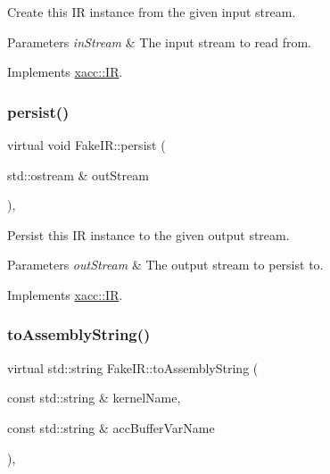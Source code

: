 Create this IR instance from the given input stream.


\begin{DoxyParams}{Parameters}
{\em in\+Stream} & The input stream to read from. \\
\hline
\end{DoxyParams}


Implements \hyperlink{a02480_a444c2e4dc0faac500fb70fa93997e9bc}{xacc\+::\+IR}.

\mbox{\label{a02492_a459bd7e4a007ab80678df279eb038b51}} 
\subsubsection{\texorpdfstring{persist()}{persist()}}
{\footnotesize\ttfamily virtual void Fake\+I\+R\+::persist (\begin{DoxyParamCaption}\item[{std\+::ostream \&}]{out\+Stream }\end{DoxyParamCaption})\hspace{0.3cm}{\ttfamily [inline]}, {\ttfamily [virtual]}}

Persist this IR instance to the given output stream.


\begin{DoxyParams}{Parameters}
{\em out\+Stream} & The output stream to persist to. \\
\hline
\end{DoxyParams}


Implements \hyperlink{a02480_a414b72224d88473ad6190bb88102a3ea}{xacc\+::\+IR}.

\mbox{\label{a02492_ac8b4fa63654de7830e2a6110559ffd87}} 
\subsubsection{\texorpdfstring{to\+Assembly\+String()}{toAssemblyString()}}
{\footnotesize\ttfamily virtual std\+::string Fake\+I\+R\+::to\+Assembly\+String (\begin{DoxyParamCaption}\item[{const std\+::string \&}]{kernel\+Name,  }\item[{const std\+::string \&}]{acc\+Buffer\+Var\+Name }\end{DoxyParamCaption})\hspace{0.3cm}{\ttfamily [inline]}, {\ttfamily [virtual]}}

